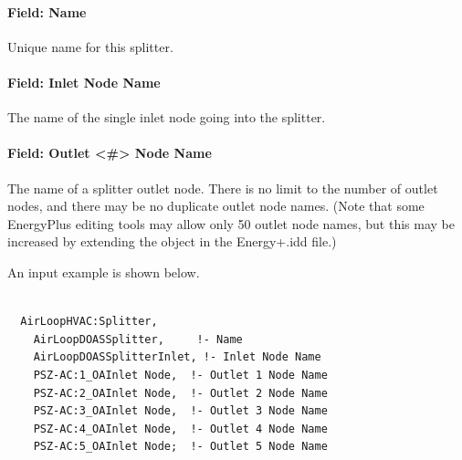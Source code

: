 \paragraph{Field: Name}\label{field-name-4-002}

Unique name for this splitter.

\paragraph{Field: Inlet Node Name}\label{field-inlet-node-name-2}

The name of the single inlet node going into the splitter.

\paragraph{Field: Outlet \textless{}\#\textgreater{} Node Name}\label{field-outlet-node-name-2}

The name of a splitter outlet node. There is no limit to the number of outlet nodes, and there may be no duplicate outlet node names. (Note that some EnergyPlus editing tools may allow only 50 outlet node names, but this may be increased by extending the object in the Energy+.idd file.)

An input example is shown below.

\begin{lstlisting}

  AirLoopHVAC:Splitter,
    AirLoopDOASSplitter,     !- Name
    AirLoopDOASSplitterInlet, !- Inlet Node Name
    PSZ-AC:1_OAInlet Node,  !- Outlet 1 Node Name
    PSZ-AC:2_OAInlet Node,  !- Outlet 2 Node Name
    PSZ-AC:3_OAInlet Node,  !- Outlet 3 Node Name
    PSZ-AC:4_OAInlet Node,  !- Outlet 4 Node Name
    PSZ-AC:5_OAInlet Node;  !- Outlet 5 Node Name
\end{lstlisting}
